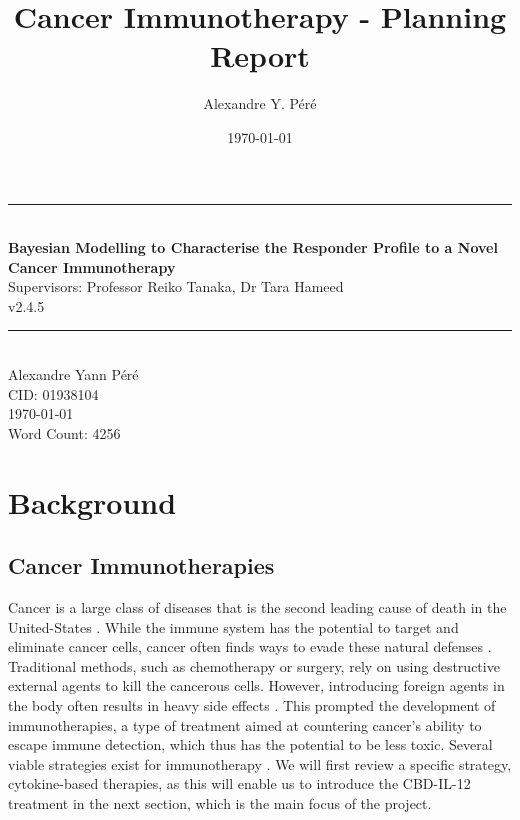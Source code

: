 \documentclass[11pt]{article}
\title{Cancer Immunotherapy - Planning Report}
\author{Alexandre Y. Péré }
\date{\today}
\begin{document}
\begin{titlepage}
    \newcommand{\HRule}{\rule{\linewidth}{0.5mm}}
    \begin{center}
        \HRule \\[0.4cm]
    { \LARGE \bfseries Bayesian Modelling to Characterise the Responder Profile to a  Novel Cancer Immunotherapy\\[0.55cm] }
    { \large Supervisors: Professor Reiko Tanaka, Dr Tara Hameed} \\
    v2.4.5
    \\[0.4cm]
    \HRule \\[0.5cm]
    { \large Alexandre Yann Péré \\[0.1cm]
    CID: 01938104  \\[0.1cm]
    \today \\ [0.1cm]
    \vspace{10pt}
    Word Count: 4256}
    \end{center}
\end{titlepage}

\tableofcontents


%

\pagebreak 
\section{Background}\label{sec:specs}

\subsection{Cancer Immunotherapies}\label{sec:cancer}
Cancer is a large class of diseases that is the second leading cause of death in the United-States \cite{nchs}. While the immune system has the potential to target and eliminate cancer cells, cancer often finds ways to evade these natural defenses \cite{EvasionMech}. Traditional methods, such as chemotherapy or surgery, rely on using destructive external agents to kill the cancerous cells. However, introducing foreign agents in the body often results in heavy side effects \cite{oncologyTreatRev}. This prompted the development of immunotherapies, a type of treatment aimed at countering cancer's ability to escape immune detection, which thus has the potential to be less toxic. Several viable strategies exist for immunotherapy \cite{ReviewCPI}. We will first review a specific strategy, cytokine-based therapies, as this will enable us to introduce the CBD-IL-12 treatment in the next section, which is the main focus of the project.
\end{document}
